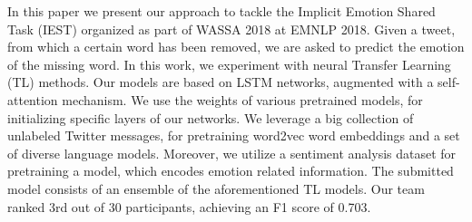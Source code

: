 In this paper we present our approach to tackle the Implicit Emotion Shared Task (IEST) organized as part of WASSA 2018 at EMNLP 2018. Given a tweet, from which a certain word has been removed, we are asked to predict the emotion of the missing word. In this work, we experiment with neural Transfer Learning (TL) methods. Our models are based on LSTM networks, augmented with a self-attention mechanism. We use the weights of various pretrained models, for initializing specific layers of our networks. We leverage a big collection of unlabeled Twitter messages, for pretraining word2vec word embeddings and a set of diverse language models. Moreover, we utilize a sentiment analysis dataset for pretraining a model, which encodes emotion related information. The submitted model consists of an ensemble of the aforementioned TL models. Our team ranked 3rd out of 30 participants, achieving an F1 score of 0.703.
